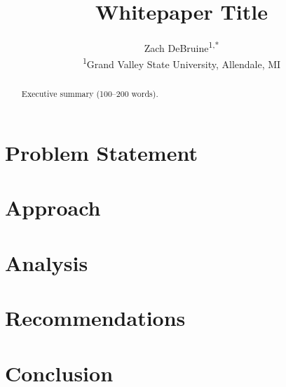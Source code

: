 \documentclass[11pt,letterpaper]{article}
\title{Whitepaper Title}
\author{
  Zach DeBruine\textsuperscript{1,*}
  \\[6pt]
  \textsuperscript{1}Grand Valley State University, Allendale, MI
}
\begin{document}
\maketitle
{}

\begin{abstract}
  Executive summary (100--200 words).
\end{abstract}

\tableofcontents
\vspace{1em}

\section{Problem Statement}

\section{Approach}

\section{Analysis}

\section{Recommendations}

\section{Conclusion}


\end{document}
